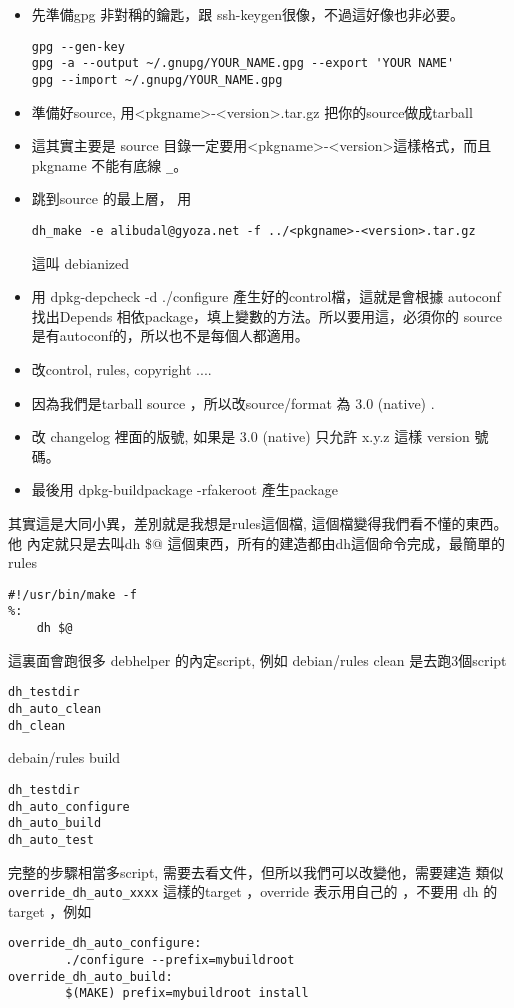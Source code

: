   \begin{itemize}
    \item 先準備gpg 非對稱的鑰匙，跟 ssh-keygen很像，不過這好像也非必要。
  \begin{verbatim}
gpg --gen-key
gpg -a --output ~/.gnupg/YOUR_NAME.gpg --export 'YOUR NAME'
gpg --import ~/.gnupg/YOUR_NAME.gpg
  \end{verbatim}
    \item 準備好source, 用<pkgname>-<version>.tar.gz 把你的source做成tarball
    \item 這其實主要是 source 目錄一定要用<pkgname>-<version>這樣格式，而且
      pkgname 不能有底線 \verb=_=。
    \item 跳到source 的最上層， 用
  \begin{verbatim}
dh_make -e alibudal@gyoza.net -f ../<pkgname>-<version>.tar.gz
  \end{verbatim}
      這叫 debianized
    \item 用 dpkg-depcheck -d ./configure 產生好的control檔，這就是會根據
      autoconf 找出Depends 相依package，填上變數的方法。所以要用這，必須你的
      source 是有autoconf的，所以也不是每個人都適用。
    \item 改control, rules, copyright ....
    \item 因為我們是tarball source ，所以改source/format 為 3.0 (native) .
    \item 改 changelog 裡面的版號, 如果是 3.0 (native) 只允許 x.y.z 這樣
      version 號碼。
    \item 最後用 dpkg-buildpackage -rfakeroot 產生package
  \end{itemize}
  其實這是大同小異，差別就是我想是rules這個檔, 這個檔變得我們看不懂的東西。他
  內定就只是去叫dh \$@ 這個東西，所有的建造都由dh這個命令完成，最簡單的 rules
  \begin{verbatim}
#!/usr/bin/make -f
%:
	dh $@
  \end{verbatim}
  這裏面會跑很多
  debhelper 的內定script, 例如 debian/rules clean 是去跑3個script
  \begin{verbatim}
dh_testdir
dh_auto_clean
dh_clean
  \end{verbatim}
  debain/rules build
  \begin{verbatim}
dh_testdir
dh_auto_configure
dh_auto_build
dh_auto_test
  \end{verbatim}
  完整的步驟相當多script, 需要去看文件，但所以我們可以改變他，需要建造 
  類似\verb=override_dh_auto_xxxx= 這樣的target ，override 表示用自己的
  ，不要用 dh 的target ，例如
  \begin{verbatim}
override_dh_auto_configure:
        ./configure --prefix=mybuildroot
override_dh_auto_build:
        $(MAKE) prefix=mybuildroot install
  \end{verbatim}
